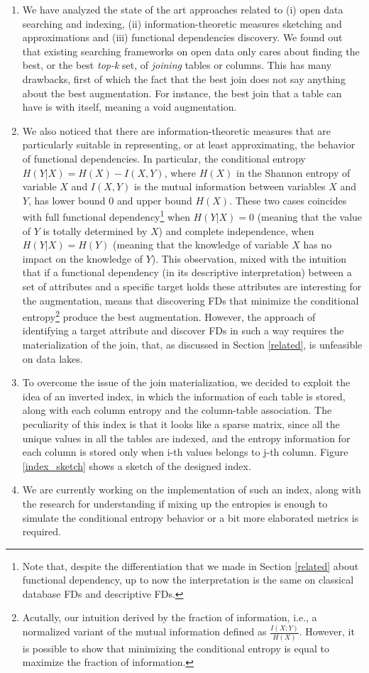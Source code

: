 \begin{enumerate}
    \item We have analyzed the state of the art approaches related to (i) open data searching and indexing, (ii) information-theoretic measures sketching and approximations and (iii) functional dependencies discovery. We found out that existing searching frameworks on open data only cares about finding the best, or the best \textit{top-k} set, of \textit{joining} tables or columns. This has many drawbacks, first of which the fact that the best join does not say anything about the best augmentation. For instance, the best join that a table can have is with itself, meaning a void augmentation. 
    \item We also noticed that there are information-theoretic measures that are particularly suitable in representing, or at least approximating, the behavior of functional dependencies. In particular, the conditional entropy $H(Y|X) = H(X)-I(X,Y)$, where $H(X)$ in the Shannon entropy of variable $X$ and $I(X,Y)$ is the mutual information between variables $X$ and $Y$, has lower bound 0 and upper bound $H(X)$. These two cases coincides with full functional dependency\footnote{Note that, despite the differentiation that we made in Section \ref{related} about functional dependency, up to now the interpretation is the same on classical database FDs and descriptive FDs.} when $H(Y|X) = 0$ (meaning that the value of $Y$ is totally determined by $X$) and complete independence, when $H(Y|X) = H(Y)$ (meaning that the knowledge of variable $X$ has no impact on the knowledge of $Y$). This observation, mixed with the intuition that if a functional dependency (in its descriptive interpretation) between a set of attributes and a specific target holds these attributes are interesting for the augmentation, means that discovering FDs that minimize the conditional entropy\footnote{Acutally, our intuition derived by the fraction of information, i.e., a normalized variant of the mutual information defined as $\frac{I(X;Y)}{H(X)}$. However, it is possible to show that minimizing the conditional entropy is equal to maximize the fraction of information.} produce the best augmentation. However, the approach of identifying a target attribute and discover FDs in such a way requires the materialization of the join, that, as discussed in Section \ref{related}, is unfeasible on data lakes.
    \item To overcome the issue of the join materialization, we decided to exploit the idea of an inverted index, in which the information of each table is stored, along with each column entropy and the column-table association. The peculiarity of this index is that it looks like a sparse matrix, since all the unique values in all the tables are indexed, and the entropy information for each column is stored only when i-th values belongs to j-th column. Figure \ref{index_sketch} shows a sketch of the designed index.
    \item We are currently working on the implementation of such an index, along with the research for understanding if mixing up the entropies is enough to simulate the conditional entropy behavior or a bit more elaborated metrics is required.
\end{enumerate}


